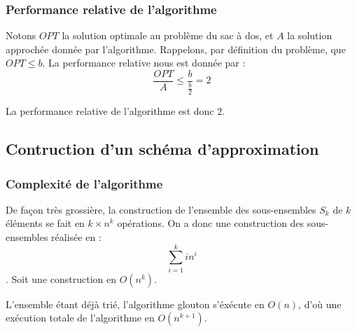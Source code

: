 \subsubsection{Performance relative de l'algorithme}

Notons $OPT$ la solution optimale au problème du sac à dos, et $A$ la solution approchée donnée par
l'algorithme. Rappelons, par définition du problème, que $OPT \leq b $. La performance relative nous
est donnée par : $$
\frac{OPT}{A} \leq \frac{b}{\frac{b}{2}} = 2 $$

La performance relative de l'algorithme est donc 2.

\subsection{Contruction d'un schéma d'approximation}

\subsubsection{Complexité de l'algorithme}

De façon très grossière, la construction de l'ensemble des sous-ensembles $S_k$ de $k$ éléments se
fait en $k\times n^k$ opérations. On a donc une construction des sous-ensembles réalisée en : $$
\sum_{i=1}^k i n^i $$. Soit une construction en $O(n^k)$.

L'ensemble étant déjà trié, l'algorithme glouton s'éxécute en $O(n)$, d'où une exécution totale de
l'algorithme en $O(n^{k+1})$.

